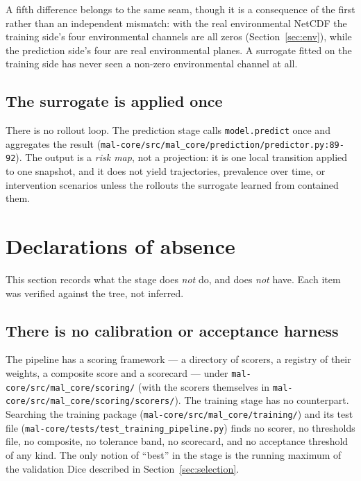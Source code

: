 \documentclass[11pt,a4paper]{article}
\newcommand{\codex}[1]{\texttt{#1}}
\begin{document}
A fifth difference belongs to the same seam, though it is a consequence of
the first rather than an independent mismatch: with the real environmental
NetCDF the training side's four environmental channels are all zeros
(Section~\ref{sec:env}), while the prediction side's four are real
environmental planes. A surrogate fitted on the training side has never seen
a non-zero environmental channel at all.

\subsection{The surrogate is applied once}

There is no rollout loop. The prediction stage calls \codex{model.predict}
once and aggregates the result
(\codex{mal-core/\allowbreak{}src/\allowbreak{}mal\_\allowbreak{}core/\allowbreak{}prediction/\allowbreak{}predictor.py:89-92}). The output is a
\emph{risk map}, not a projection: it is one local transition applied to one
snapshot, and it does not yield trajectories, prevalence over time, or
intervention scenarios unless the rollouts the surrogate learned from
contained them.

\section{Declarations of absence}

\label{sec:absences}

This section records what the stage does \emph{not} do, and does \emph{not}
have. Each item was verified against the tree, not inferred.

\subsection{There is no calibration or acceptance harness}

The pipeline has a scoring framework --- a directory of scorers, a registry
of their weights, a composite score and a scorecard --- under
\codex{mal-core/\allowbreak{}src/\allowbreak{}mal\_\allowbreak{}core/\allowbreak{}scoring/\allowbreak{}} (with the
scorers themselves in \codex{mal-core/\allowbreak{}src/\allowbreak{}mal\_\allowbreak{}core/\allowbreak{}scoring/\allowbreak{}scorers/\allowbreak{}}).
The training stage has
no counterpart. Searching the training package
(\codex{mal-core/\allowbreak{}src/\allowbreak{}mal\_\allowbreak{}core/\allowbreak{}training/\allowbreak{}}) and its test file
(\codex{mal-core/\allowbreak{}tests/\allowbreak{}test\_\allowbreak{}training\_\allowbreak{}pipeline.py}) finds no scorer, no
thresholds file, no composite, no tolerance band, no scorecard, and no
acceptance threshold of any kind. The only notion of ``best'' in the stage is
the running maximum of the validation Dice described in
Section~\ref{sec:selection}.
\end{document}
